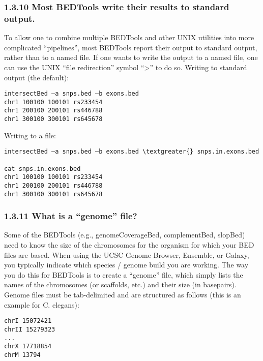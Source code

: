 \documentclass[letterpaper,10pt,english]{sphinxmanual}
\begin{document}
\subsubsection{1.3.10 Most BEDTools write their results to standard output.}
\label{content/overview:most-bedtools-write-their-results-to-standard-output}
To allow one to combine multiple BEDTools and other UNIX utilities into more complicated “pipelines”,
most BEDTools report their output to standard output, rather than to a named file. If one wants to write the output to a named file, one can use the UNIX “file redirection” symbol “\textgreater{}” to do so.
Writing to standard output (the default):

\begin{Verbatim}[commandchars=\\\{\}]
intersectBed –a snps.bed –b exons.bed
chr1 100100 100101 rs233454
chr1 200100 200101 rs446788
chr1 300100 300101 rs645678
\end{Verbatim}

Writing to a file:

\begin{Verbatim}[commandchars=\\\{\}]
intersectBed –a snps.bed –b exons.bed \textgreater{} snps.in.exons.bed

cat snps.in.exons.bed
chr1 100100 100101 rs233454
chr1 200100 200101 rs446788
chr1 300100 300101 rs645678
\end{Verbatim}


\subsubsection{1.3.11 What is a “genome” file?}
\label{content/overview:what-is-a-genome-file}
Some of the BEDTools (e.g., genomeCoverageBed, complementBed, slopBed) need to know the size of
the chromosomes for the organism for which your BED files are based. When using the UCSC Genome
Browser, Ensemble, or Galaxy, you typically indicate which species / genome build you are working.
The way you do this for BEDTools is to create a “genome” file, which simply lists the names of the
chromosomes (or scaffolds, etc.) and their size (in basepairs).
Genome files must be tab-delimited and are structured as follows (this is an example for C. elegans):

\begin{Verbatim}[commandchars=\\\{\}]
chrI 15072421
chrII 15279323
...
chrX 17718854
chrM 13794
\end{Verbatim}
\end{document}
